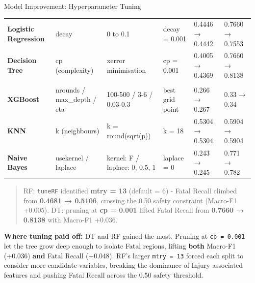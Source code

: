 \documentclass[
  ignorenonframetext,
]{beamer}
\begin{document}
\begin{frame}[fragile]{Model Improvement: Hyperparameter Tuning}
\label{model-improvement-hyperparameter-tuning}
\begingroup\fontsize{12}{14}\selectfont

\begin{longtabu} to 
\toprule
{} &  &  &  &  & \\
\midrule
\textbf{Logistic Regression} & decay & 0 to 0.1 & decay = 0.001 & 0.4446 → 0.4442 & 0.7660 → 0.7553\\
\textbf{Decision Tree} & cp (complexity) & xerror minimisation & cp = 0.001 & 0.4005 → 0.4369 & 0.7660 → 0.8138\\
\textbf{} &  &  &  &  & \\
\textbf{XGBoost} & nrounds / max\_depth / eta & 100-500 / 3-6 / 0.03-0.3 & best grid point & 0.266 → 0.267 & 0.33 → 0.34\\
\textbf{KNN} & k (neighbours) & k = round(sqrt(p)) & k = 18 & 0.5304 → 0.5304 & 0.5904 → 0.5904\\
\addlinespace
\textbf{Naive Bayes} & usekernel / laplace & kernel: F / laplace: 0, 0.5, 1 & laplace = 0 & 0.243 → 0.245 & 0.771 → 0.782\\
\bottomrule
\end{longtabu}
\endgroup{}

\begin{quote}
RF: \texttt{tuneRF} identified \textbf{mtry = 13} (default = 6) - Fatal
Recall climbed from \textbf{0.4681 → 0.5106}, crossing the 0.50 safety
constraint (Macro-F1 +0.005). DT: pruning at \textbf{cp = 0.001} lifted
Fatal Recall from \textbf{0.7660 → 0.8138} with Macro-F1 +0.036.
\end{quote}

\textbf{Where tuning paid off:} DT and RF gained the most. Pruning at
\texttt{cp\ =\ 0.001} let the tree grow deep enough to isolate Fatal
regions, lifting \textbf{both} Macro-F1 (+0.036) \textbf{and} Fatal
Recall (+0.048). RF's larger \texttt{mtry\ =\ 13} forced each split to
consider more candidate variables, breaking the dominance of
Injury-associated features and pushing Fatal Recall across the 0.50
safety threshold.


\end{frame}
\end{document}
